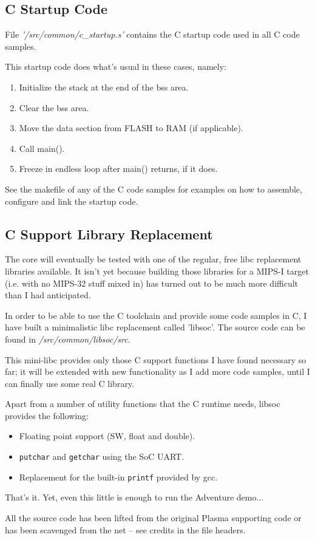 \subsection{C Startup Code}
\label{c_startup_code}

    File \emph{'/src/common/c\_startup.s'} contains the C startup code used 
    in all C code samples.
    
    This startup code does what's usual in these cases, namely:
    
    \begin{enumerate}
    \item Initialize the stack at the end of the bss area.
    \item Clear the bss area.
    \item Move the data section from FLASH to RAM (if applicable).
    \item Call main().
    \item Freeze in endless loop after main() returns, if it does.
    \end{enumerate}
    
    
    See the makefile of any of the C code samples for examples on how to 
    assemble, configure and link the startup code.


\subsection{C Support Library Replacement}
\label{libsoc}

    The core will eventually be tested with one of the regular, free libc 
    replacement libraries available. It isn't yet because building those 
    libraries for a MIPS-I target (i.e. with no MIPS-32 stuff mixed in) has 
    turned out to be much more difficult than I had anticipated.
    
    In order to be able to use the C toolchain and provide some code samples in 
    C, I have built a minimalistic libc replacement called 'libsoc'. The 
    source code can be found in \emph{/src/common/libsoc/src}. 
    
    This mini-libc provides only those C support functions I have found 
    necessary so far; it will be extended with new functionality as I add more
    code samples, until I can finally use some real C library.
    
    Apart from a number of utility functions that the C runtime needs, libsoc 
    provides the following:
    
    \begin{itemize}
    \item Floating point support (SW, float and double).
    \item \texttt{putchar} and \texttt{getchar} using the SoC UART.
    \item Replacement for the built-in \texttt{printf} provided by gcc.
    \end{itemize}
    
    That's it. Yet, even this little is enough to run the Adventure demo...
    
    All the source code has been lifted from the original Plasma supporting code
    or has been scavenged from the net -- see credits in the file headers.

